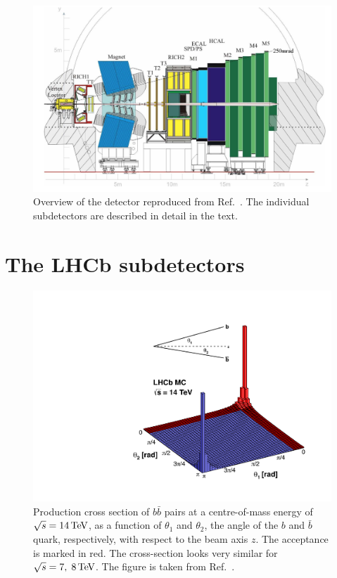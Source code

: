 \begin{figure}[tb]
    \centering
    \includegraphics[width=\columnwidth]{figures/detector/LHCb_detector.png}
    \caption{Overview of the \lhcb detector reproduced from Ref.~\cite{LHCb-detector,CERN-LHCC-2003-030}. The individual subdetectors are described in detail in the text.}
    \label{fig:lhcb_detector}
\end{figure}



\section{The LHCb subdetectors} %
\label{sec:subdetectors}

\begin{figure}[tbp]
    \centering
    \includegraphics[width=0.8\columnwidth]{figures/detector/bbangles.pdf}
    \caption{Production cross section of $b\bar b$ pairs at a centre-of-mass energy of $\sqrt s = 14\text{\,Te\kern -0.1em V}$, as a function of $\theta_1$ and $\theta_2$, the angle of the $b$ and $\bar b$ quark, respectively, with respect to the beam axis $z$. The \lhcb acceptance is marked in red. The cross-section looks very similar for $\sqrt s = 7,\; 8\text{\,Te\kern -0.1em V}$. The figure is taken from Ref.~\cite{bbangles}.}
    \label{fig:bb_angles}
\end{figure}

